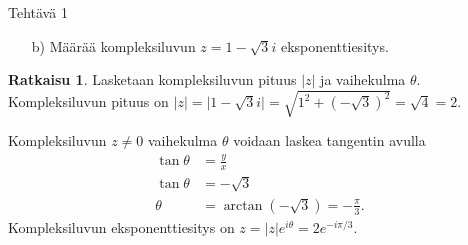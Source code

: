 \documentclass[12pt, a4paper, t]{beamer}
\theoremstyle{exercise}
\theoremstyle{remark}
\theoremstyle{definition}
\newcommand{\abs}[1]{\lvert#1\rvert}
\newtheorem*{rat}{Ratkaisu}
\begin{document}
\begin{frame}{Tehtävä 1}

\vspace{12pt}
\begin{enumerate}[leftmargin=*, label=\alph*), topsep=0pt, itemsep=12pt, parsep=0pt, font=\bfseries\color{red}]

\item[b)] Määrää kompleksiluvun $\displaystyle z=1-\sqrt{3}i$ eksponenttiesitys.
\end{enumerate}
\vspace{100pt}
\pause
\begin{rat}
Lasketaan kompleksiluvun pituus $\abs{z}$ ja vaihekulma $\theta.$
\pause
Kompleksiluvun pituus on
$\displaystyle
\abs{z}=\abs{1-\sqrt{3}i}=\sqrt{1^2+(-\sqrt{3})^2}=\sqrt{4}=2.
$
\pause

Kompleksiluvun $z\neq 0$ vaihekulma $\theta$ voidaan laskea tangentin avulla
\begin{align*}
\tan \theta &=\frac{y}{x}\\
\tan \theta &=-\sqrt{3}\\
\theta &=\arctan(-\sqrt{3})=-\frac{\pi}{3}.
\end{align*}
\pause
Kompleksiluvun eksponenttiesitys on
$\displaystyle
z=\abs{z}e^{i\theta}=2e^{-i\pi/3}.
$
\end{rat}
\end{frame}
\end{document}
